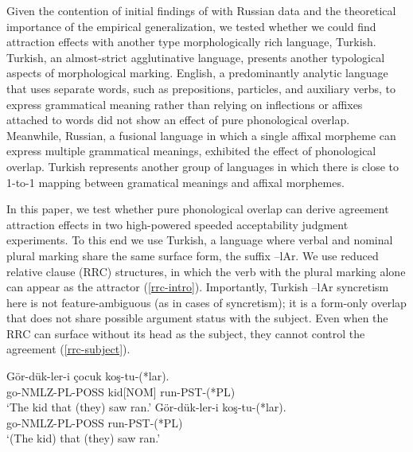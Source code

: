 \documentclass[
  authoryear,
  3p]{elsarticle}
\begin{document}
Given the contention of initial findings of \citet{BockEberhard1993}
with Russian data and the theoretical importance of the empirical
generalization, we tested whether we could find attraction effects with
another type morphologically rich language, Turkish. Turkish, an
almost-strict agglutinative language, presents another typological
aspects of morphological marking. English, a predominantly analytic
language that uses separate words, such as prepositions, particles, and
auxiliary verbs, to express grammatical meaning rather than relying on
inflections or affixes attached to words did not show an effect of pure
phonological overlap. Meanwhile, Russian, a fusional language in which a
single affixal morpheme can express multiple grammatical meanings,
exhibited the effect of phonological overlap. Turkish represents another
group of languages in which there is close to 1-to-1 mapping between
gramatical meanings and affixal morphemes.

In this paper, we test whether pure phonological overlap can derive
agreement attraction effects in two high-powered speeded acceptability
judgment experiments. To this end we use Turkish, a language where
verbal and nominal plural marking share the same surface form, the
suffix --lAr. We use reduced relative clause (RRC) structures, in which
the verb with the plural marking alone can appear as the attractor
(\ref{rrc-intro}). Importantly, Turkish --lAr syncretism here is not
feature-ambiguous (as in cases of syncretism); it is a form-only overlap
that does not share possible argument status with the subject. Even when
the RRC can surface without its head as the subject, they cannot control
the agreement (\ref{rrc-subject}).

\begin{exe}
\ex \label{rrc-intro}
\gll Gör-dük-ler-i çocuk koş-tu-(*lar).\\
go-NMLZ-PL-POSS kid[NOM] run-PST-(*PL)\\
\glt `The kid that (they) saw ran.'
\ex \label{rrc-subject}
\gll Gör-dük-ler-i koş-tu-(*lar).\\
go-NMLZ-PL-POSS run-PST-(*PL)\\
\glt `(The kid) that (they) saw ran.'
\end{exe}
\end{document}
